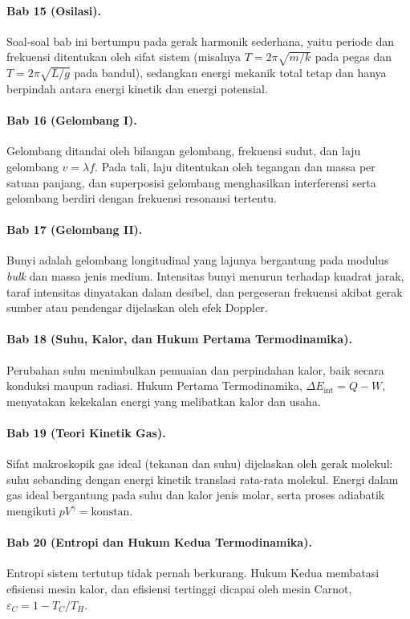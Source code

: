 \documentclass[12pt,a4paper]{article}
\begin{document}
\paragraph{Bab 15 (Osilasi).}
Soal-soal bab ini bertumpu pada gerak harmonik sederhana, yaitu periode dan frekuensi
ditentukan oleh sifat sistem (misalnya $T = 2\pi\sqrt{m/k}$ pada pegas dan $T = 2\pi\sqrt{L/g}$ pada
bandul), sedangkan energi mekanik total tetap dan hanya berpindah antara energi kinetik dan
energi potensial.

\paragraph{Bab 16 (Gelombang I).}
Gelombang ditandai oleh bilangan gelombang, frekuensi sudut, dan laju gelombang
$v = \lambda f$. Pada tali, laju ditentukan oleh tegangan dan massa per satuan panjang, dan
superposisi gelombang menghasilkan interferensi serta gelombang berdiri dengan frekuensi
resonansi tertentu.

\paragraph{Bab 17 (Gelombang II).}
Bunyi adalah gelombang longitudinal yang lajunya bergantung pada modulus \textit{bulk} dan massa
jenis medium. Intensitas bunyi menurun terhadap kuadrat jarak, taraf intensitas dinyatakan
dalam desibel, dan pergeseran frekuensi akibat gerak sumber atau pendengar dijelaskan oleh
efek Doppler.

\paragraph{Bab 18 (Suhu, Kalor, dan Hukum Pertama Termodinamika).}
Perubahan suhu menimbulkan pemuaian dan perpindahan kalor, baik secara konduksi maupun
radiasi. Hukum Pertama Termodinamika, $\Delta E_{\text{int}} = Q - W$, menyatakan kekekalan energi
yang melibatkan kalor dan usaha.

\paragraph{Bab 19 (Teori Kinetik Gas).}
Sifat makroskopik gas ideal (tekanan dan suhu) dijelaskan oleh gerak molekul: suhu
sebanding dengan energi kinetik translasi rata-rata molekul. Energi dalam gas ideal
bergantung pada suhu dan kalor jenis molar, serta proses adiabatik mengikuti $pV^{\gamma}=\text{konstan}$.

\paragraph{Bab 20 (Entropi dan Hukum Kedua Termodinamika).}
Entropi sistem tertutup tidak pernah berkurang. Hukum Kedua membatasi efisiensi mesin kalor,
dan efisiensi tertinggi dicapai oleh mesin Carnot, $\varepsilon_C = 1 - T_C/T_H$.
\end{document}
